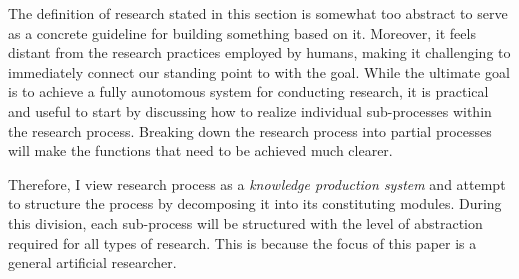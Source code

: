 




The definition of research stated in this section is somewhat too abstract to serve as a concrete guideline for building something based on it. Moreover, it feels distant from the research practices employed by humans, making it challenging to immediately connect our standing point to with the goal. While the ultimate goal is to achieve a fully aunotomous system for conducting research, it is practical and useful to start by discussing how to realize individual sub-processes within the research process. Breaking down the research process into partial processes will make the functions that need to be achieved much clearer.

Therefore, I view research process as a \textit{knowledge production system} and attempt to structure the process by decomposing it into its constituting modules. During this division, each sub-process will be structured with the level of abstraction required for all types of research. This is because the focus of this paper is a general artificial researcher. 

